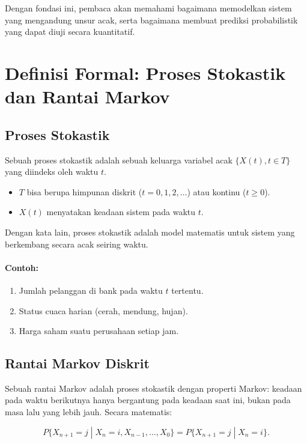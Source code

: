 \documentclass{bukumjh}
\begin{document}
Dengan fondasi ini, pembaca akan memahami bagaimana memodelkan sistem yang mengandung unsur acak, serta bagaimana membuat prediksi probabilistik yang dapat diuji secara kuantitatif.

\section{Definisi Formal: Proses Stokastik dan Rantai Markov}

\subsection{Proses Stokastik}

Sebuah {\jsg proses stokastik} adalah sebuah keluarga variabel acak $\{X(t), t \in T\}$ yang diindeks oleh waktu $t$.  
\begin{itemize}
    \item $T$ bisa berupa himpunan diskrit ($t=0,1,2,\dots$) atau kontinu ($t \geq 0$).  
    \item $X(t)$ menyatakan keadaan sistem pada waktu $t$.  
\end{itemize}

Dengan kata lain, proses stokastik adalah model matematis untuk sistem yang berkembang secara acak seiring waktu.

\paragraph{Contoh:}
\begin{enumerate}
    \item Jumlah pelanggan di bank pada waktu $t$ tertentu.  
    \item Status cuaca harian (cerah, mendung, hujan).  
    \item Harga saham suatu perusahaan setiap jam.  
\end{enumerate}

\subsection{Rantai Markov Diskrit}

Sebuah {\jsg rantai Markov} adalah proses stokastik dengan {\jsg properti Markov}: keadaan pada waktu berikutnya hanya bergantung pada keadaan saat ini, bukan pada masa lalu yang lebih jauh. Secara matematis:

\[
P\{X_{n+1} = j \;|\; X_n = i, X_{n-1}, \dots, X_0\} = P\{X_{n+1} = j \;|\; X_n = i\}.
\]
\end{document}
